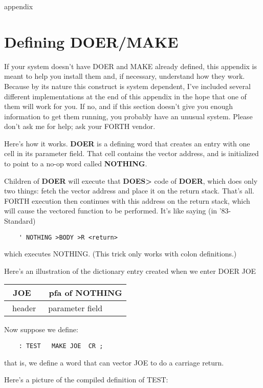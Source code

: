 appendix{}
\chapter{
Defining
DOER/MAKE}
If your system doesn't have DOER and MAKE already defined, this appendix
is meant to help you install them and, if necessary, understand
how they work.  Because by its nature this construct is system
dependent, I've included several different implementations at the end of
this appendix in the hope that one of them will work for you.  If no, and if
this section doesn't give you enough information to get them running,
you probably have an unusual system.  Please don't ask me for help; ask
your FORTH vendor.

Here's how it works.  {\bf DOER} is a defining word that creates an entry
with one cell in its parameter field. That cell contains the vector address,
and is initialized to point to a no-op word called {\bf NOTHING}.

Children of {\bf DOER} will execute that {\bf DOES> } code of {\bf DOER}, which
does only two things:  fetch the vector address and place it on the return
stack.  That's all.  FORTH execution then continues with this address on
the return stack, which will cause the vectored function to be performed.
It's like saying (in '83-Standard)
\begin{verbatim}
    ' NOTHING >BODY >R <return>
\end{verbatim}
which executes NOTHING.  (This trick only works with colon definitions.)

Here's an illustration of the dictionary entry created when we enter
DOER JOE 


{\sf
\begin{tabular}{@{} l l@{}}
\hline
\vline\ JOE & \vline\ pfa of NOTHING \vline \\
\hline
\ header &\  parameter field
\end{tabular}
}


Now suppose we define:
\begin{verbatim}
    : TEST   MAKE JOE  CR ;
\end{verbatim}
that is, we define a word that can vector JOE to do a carriage return.

Here's a picture of the compiled definition of TEST:  \\

